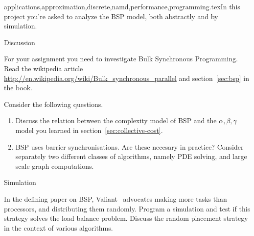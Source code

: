 {applications,approximation,discrete,namd,performance,programming}.texIn this project you're asked to analyze the \acf{BSP} model, both
abstractly and by simulation.

 {Discussion}

For your assignment you need to investigate Bulk Synchronous
Programming. Read the wikipedia article
\url{http://en.wikipedia.org/wiki/Bulk_synchronous_parallel} and
section~\ref{sec:bsp} in the book.  

Consider the following questions.

\begin{enumerate}
\item Discuss the relation between the complexity model of BSP and the
  $\alpha,\beta,\gamma$ model you learned in
  section~\ref{sec:collective-cost}.
\item \ac{BSP} uses barrier synchronisations. Are these necesary in
  practice? Consider separately two different classes of algorithms, namely
  \ac{PDE} solving, and large scale graph computations.
\end{enumerate}

 {Simulation}

In the defining paper on \ac{BSP}, Valiant~\cite{Valiant:1990:BSP}
advocates making more tasks than processors, and distributing them
randomly. Program a simulation and test if this strategy solves the
load balance problem. Discuss the random placement strategy in the
context of various algorithms.

